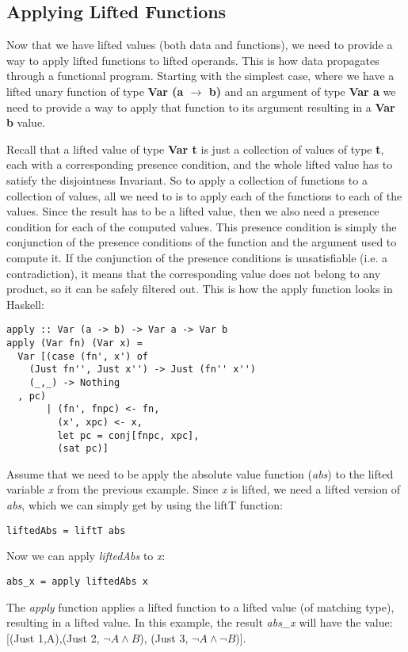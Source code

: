 \documentclass[10pt,conference]{IEEEtran}
\begin{document}
\subsection{Applying Lifted Functions}

Now that we have lifted values (both data and functions), we need to provide a way to apply lifted functions to lifted operands. This is how data propagates through a functional program. Starting with the simplest case, where we have a lifted unary function of type \textbf{Var (a $\to$ b)} and an argument of type \textbf{Var a} we need to provide a way to apply that function to its argument resulting in a \textbf{Var b} value.

Recall that a lifted value of type \textbf{Var t} is just a collection of values of type \textbf{t}, each with a corresponding presence condition, and the whole lifted value has to satisfy the disjointness Invariant. So to apply a collection of functions to a collection of values, all we need to is to apply each of the functions to each of the values. Since the result has to be a lifted value, then we also need a presence condition for each of the computed values. This presence condition is simply the conjunction of the presence conditions of the function and the argument used to compute it. If the conjunction of the presence conditions is unsatisfiable (i.e. a contradiction), it means that the corresponding value does not belong to any product, so it can be safely filtered out. This is how the apply function looks in Haskell:

\begin{verbatim}
apply :: Var (a -> b) -> Var a -> Var b
apply (Var fn) (Var x) =
  Var [(case (fn', x') of
    (Just fn'', Just x'') -> Just (fn'' x'')
    (_,_) -> Nothing
  , pc) 
       | (fn', fnpc) <- fn,
         (x', xpc) <- x,
         let pc = conj[fnpc, xpc],
         (sat pc)]
\end{verbatim}

\begin{exmp}

Assume that we need to be apply the absolute value function (\emph{abs}) to the lifted variable \emph{x} from the previous example. Since \emph{x} is lifted, we need a lifted version of \emph{abs}, which we can simply get by using the liftT function:

\begin{verbatim}
liftedAbs = liftT abs
\end{verbatim}

Now we can apply \emph{liftedAbs} to \emph{x}:

\begin{verbatim}
abs_x = apply liftedAbs x
\end{verbatim}

The \emph{apply} function applies a lifted function to a lifted value (of matching type), resulting in a lifted value. In this example, the result \emph{abs\_x} will have the value: \\

[(Just 1,A),(Just 2, $\neg A \wedge B$), (Just 3, $\neg A\wedge \neg B$)].

\end{exmp}
\end{document}

